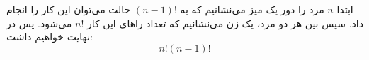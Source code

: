 \p
      ابتدا $n$ 
      مرد را دور یک میز می‌نشانیم که به 
      $(n-1)!$ حالت می‌توان این کار را انجام داد. سپس بین هر دو مرد، یک زن می‌نشانیم که تعداد را‌های این کار 
      $n!$ می‌شود. پس در نهایت خواهیم داشت:
      $$n!(n-1)!$$

